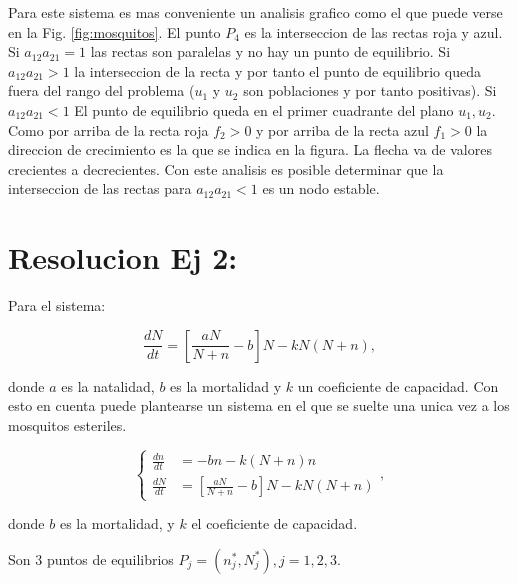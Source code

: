 \documentclass[twocolumn,aps,prl]{revtex4-1}
\newcommand{\nstar}{n^*}
\newcommand{\Nstar}{N^*}
\begin{document}

Para este sistema es mas conveniente un analisis grafico como el que puede verse en la Fig. \ref{fig:mosquitos}. El punto $P_4$ es la interseccion de las rectas roja y azul. Si $a_{12} a_{21} = 1$ las rectas son paralelas y no hay un punto de equilibrio. Si $a_{12} a_{21} > 1$ la interseccion de la recta y por tanto el punto de equilibrio queda fuera del rango del problema ($u_1$ y $u_2$ son poblaciones y por tanto positivas). Si $a_{12} a_{21} < 1$ El punto de equilibrio queda en el primer cuadrante del plano $u_1, u_2$. Como por arriba de la recta roja $f_2>0$ y por arriba de la recta azul $f_1>0$ la direccion de crecimiento es la que se indica en la figura. La flecha va de valores crecientes a decrecientes. Con este analisis es posible determinar que la interseccion de las rectas para $a_{12} a_{21} < 1$ es un nodo estable.

% 

\section{Resolucion Ej 2:}

Para el sistema:

\begin{equation}
    \frac{d N}{d t}=\left[\frac{a N}{N+n}-b\right] N- k N(N+n),
\end{equation}

donde $a$ es la natalidad, $b$ es la mortalidad y $k$ un coeficiente de capacidad. Con esto en cuenta puede plantearse un sistema en el que se suelte una unica vez a los mosquitos esteriles.

\begin{equation}
    \left\lbrace
    \begin{aligned}
        \frac{d n}{d t}&=  -b n - k (N+n) n \\
        \frac{d N}{d t}&=\left[\frac{a N}{N+n}-b\right] N- k N(N+n)
    \end{aligned}
    \right. ,
\end{equation}

donde $b$ es la mortalidad, y $k$ el coeficiente de 
capacidad.


Son 3 puntos de equilibrios $P_j = (\nstar_{j},\Nstar_{j}), j= 1, 2, 3$.
\end{document}
